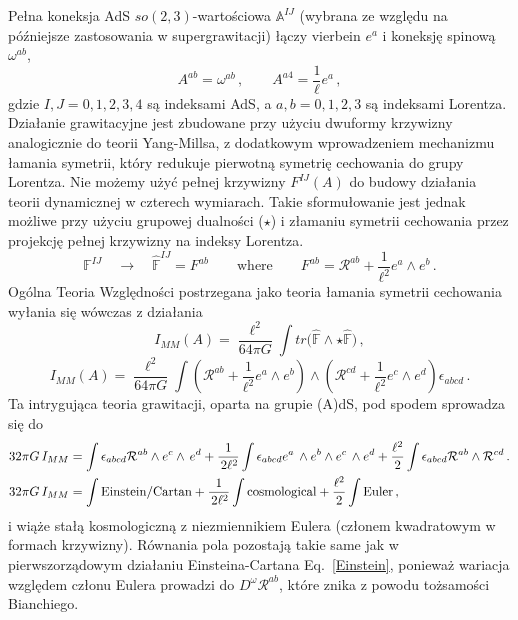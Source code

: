 \documentclass[12pt,a4paper]{article}
\begin{document}
Pełna koneksja AdS $so(2,3)$-wartościowa $\mathbb{A}^{IJ}$ (wybrana ze względu na późniejsze zastosowania w supergrawitacji) łączy vierbein $e^a$ i koneksję spinową $\omega^{ab}$,
\begin{equation}
	A^{ab}=\omega^{ab}\,,\qquad  A^{a4}=\frac{1}{\ell}e^a\,,
\end{equation}
gdzie $I,J=0,1,2,3,4$ są indeksami AdS, a $a, b = 0, 1, 2, 3$ są indeksami Lorentza. Działanie grawitacyjne jest zbudowane przy użyciu dwuformy krzywizny analogicznie do teorii Yang-Millsa, z dodatkowym wprowadzeniem mechanizmu łamania symetrii, który redukuje pierwotną symetrię cechowania do grupy Lorentza. Nie możemy użyć pełnej krzywizny $F^{IJ}(A)$ do budowy działania teorii dynamicznej w czterech wymiarach. Takie sformułowanie jest jednak możliwe przy użyciu grupowej dualności ($\star$) i złamaniu symetrii cechowania przez projekcję pełnej krzywizny na indeksy Lorentza.
\begin{equation}
	\mathbb{F}^{IJ}\quad\rightarrow\quad \hat{\mathbb{F}}^{IJ}= F^{ab}\quad\quad \mathrm{where}\quad\quad F^{ab}=\mathcal{R}^{ab}+\frac{1}{\ell^2}e^a\wedge e^b\,.
\end{equation} 
Ogólna Teoria Względności postrzegana jako teoria łamania symetrii cechowania wyłania się wówczas z działania
\begin{equation}
	I_{MM}(A)=\frac{\ell^2}{64\pi G} \int tr\big(\hat{\mathbb{F}} \wedge \star \hat{\mathbb{F}}\big)\,,
\end{equation}
\begin{equation}
	I_{MM}(A)=\frac{\ell^2}{64\pi G} \int \left(\mathcal{R}^{ab}+\frac{1}{\ell^2}e^a\wedge e^b\right)\wedge \left(\mathcal{R}^{cd}+\frac{1}{\ell^2}e^c\wedge e^d\right)\epsilon_{abcd}\,.
\end{equation}
Ta intrygująca teoria grawitacji, oparta na grupie (A)dS, pod spodem sprowadza się do
\begin{align}
	32\pi G\,I_{MM} &= \int \epsilon_{abcd}\mathcal{R}^{ab}\wedge e^{c}\wedge \,e^{d}+\frac{1}{\,2\ell^2}\int\epsilon_{abcd} e^{a}\,\wedge e^{b}\wedge e^{c}\,\wedge
	e^{d} +\frac{\ell^2}{2}\int\epsilon_{abcd}\mathcal{R}^{ab}\wedge \mathcal{R}^{cd}\,.\notag\\
	32\pi G\, I_{MM} &=\int \mathrm{Einstein/Cartan}+\frac{1}{\,2\ell^2}\int  \mathrm{cosmological}+\frac{\ell^2}{2}\int \mathrm{Euler} \,, 
\end{align}
i wiąże stałą kosmologiczną z niezmiennikiem Eulera (członem kwadratowym w formach krzywizny). Równania pola pozostają takie same jak w pierwszorządowym działaniu Einsteina-Cartana Eq.~\eqref{Einstein}, ponieważ wariacja względem członu Eulera prowadzi do $D^\omega \mathcal{R}^{ab}$, które znika z powodu tożsamości Bianchiego.
\end{document}
